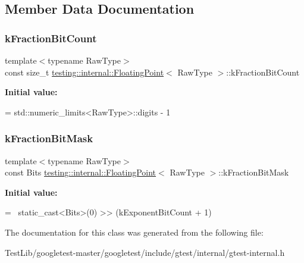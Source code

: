 \subsection{Member Data Documentation}
\mbox{\label{classtesting_1_1internal_1_1FloatingPoint_a0b756a6d2a4f5f5b41ca79651c06c043}} 
\subsubsection{\texorpdfstring{k\+Fraction\+Bit\+Count}{kFractionBitCount}}
{\footnotesize\ttfamily template$<$typename Raw\+Type$>$ \\
const size\+\_\+t \hyperlink{classtesting_1_1internal_1_1FloatingPoint}{testing\+::internal\+::\+Floating\+Point}$<$ Raw\+Type $>$\+::k\+Fraction\+Bit\+Count\hspace{0.3cm}{\ttfamily [static]}}

{\bfseries Initial value\+:}
\begin{DoxyCode}
=
    std::numeric\_limits<RawType>::digits - 1
\end{DoxyCode}
\mbox{\label{classtesting_1_1internal_1_1FloatingPoint_a0ac75d4ffd24f14bca452abe8a718da1}} 
\subsubsection{\texorpdfstring{k\+Fraction\+Bit\+Mask}{kFractionBitMask}}
{\footnotesize\ttfamily template$<$typename Raw\+Type$>$ \\
const Bits \hyperlink{classtesting_1_1internal_1_1FloatingPoint}{testing\+::internal\+::\+Floating\+Point}$<$ Raw\+Type $>$\+::k\+Fraction\+Bit\+Mask\hspace{0.3cm}{\ttfamily [static]}}

{\bfseries Initial value\+:}
\begin{DoxyCode}
=
    ~static\_cast<Bits>(0) >> (kExponentBitCount + 1)
\end{DoxyCode}


The documentation for this class was generated from the following file\+:\begin{DoxyCompactItemize}
\item 
Test\+Lib/googletest-\/master/googletest/include/gtest/internal/gtest-\/internal.\+h\end{DoxyCompactItemize}
